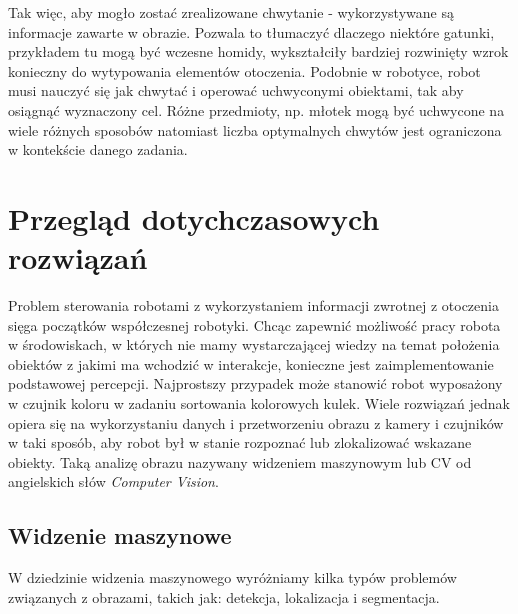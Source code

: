 \documentclass[12pt]{article}
\begin{document}
Tak więc, aby mogło zostać zrealizowane chwytanie -  wykorzystywane są informacje zawarte w obrazie. Pozwala to tłumaczyć dlaczego niektóre gatunki, przykładem tu mogą być wczesne homidy, wykształciły bardziej rozwinięty wzrok konieczny do wytypowania elementów otoczenia. Podobnie w robotyce, robot musi nauczyć się jak chwytać i operować uchwyconymi obiektami, tak aby osiągnąć wyznaczony cel. Różne przedmioty, np. młotek mogą być uchwycone na wiele różnych sposobów natomiast liczba optymalnych chwytów jest ograniczona w kontekście danego zadania. 

\newpage
\section{Przegląd dotychczasowych rozwiązań}
Problem sterowania robotami z wykorzystaniem informacji zwrotnej z otoczenia sięga początków współczesnej robotyki. Chcąc zapewnić możliwość pracy robota w środowiskach, w których nie mamy wystarczającej wiedzy na temat położenia obiektów z jakimi ma wchodzić w interakcje, konieczne jest zaimplementowanie podstawowej percepcji. Najprostszy przypadek może stanowić robot wyposażony w czujnik koloru w zadaniu sortowania kolorowych kulek. Wiele rozwiązań jednak opiera się na wykorzystaniu danych i przetworzeniu obrazu z kamery i czujników w taki sposób, aby robot był w stanie rozpoznać lub zlokalizować wskazane obiekty. Taką analizę obrazu nazywany widzeniem maszynowym lub CV od angielskich słów \emph{Computer Vision}.

\subsection{Widzenie maszynowe}
W dziedzinie widzenia maszynowego wyróżniamy kilka typów problemów związanych z obrazami, takich jak: detekcja, lokalizacja i segmentacja.
\end{document}
